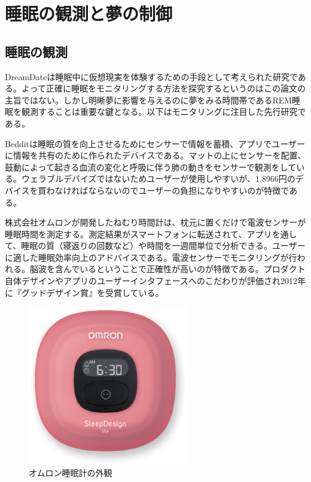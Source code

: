 \section{睡眠の観測と夢の制御}
\subsection{睡眠の観測}
DreamDateは睡眠中に仮想現実を体験するための手段として考えられた研究である。よって正確に睡眠をモニタリングする方法を探究するというのはこの論文の主旨ではない。しかし明晰夢に影響を与えるのに夢をみる時間帯であるREM睡眠を観測することは重要な鍵となる。以下はモニタリングに注目した先行研究である。

Bedditは睡眠の質を向上させるためにセンサーで情報を蓄積、アプリでユーザーに情報を共有のために作られたデバイスである。マットの上にセンサーを配置、鼓動によって起きる血流の変化と呼吸に伴う肺の動きをセンサーで観測をしている。ウェラブルデバイズではないためユーザーが使用しやすいが、1,8966円のデバイスを買わなければならないのでユーザーの負担になりやすいのが特徴である。

株式会社オムロンが開発したねむり時間計は、枕元に置くだけで電波センサーが睡眠時間を測定する。測定結果がスマートフォンに転送されて、アプリを通して、睡眠の質（寝返りの回数など）や時間を一週間単位で分析できる。ユーザーに適した睡眠効率向上のアドバイスである。電波センサーでモニタリングが行われる\cite{omron}。脳波を含んでいるということで正確性が高いのが特徴である。プロダクト自体デザインやアプリのユーザーインタフェースへのこだわりが評価され2012年に『グッドデザイン賞』を受賞している。

\begin{figure}[htbp]
\begin{center}
\includegraphics[width=7cm]{eps/omuron.eps}
\caption{オムロン睡眠計の外観}
\label{omuron}
\end{center}
\end{figure}

